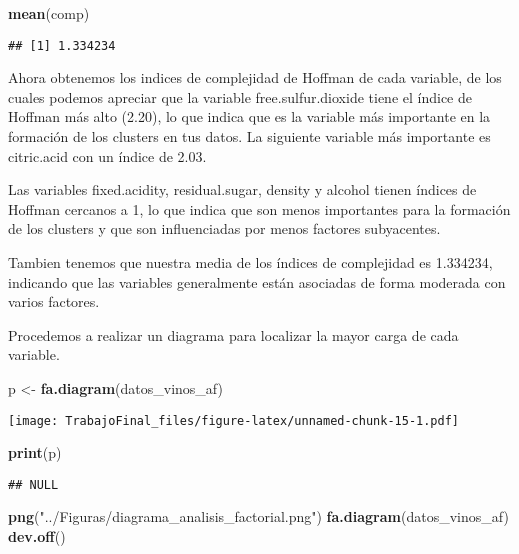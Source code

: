 \documentclass[
]{article}
\newenvironment{Shaded}{\begin{snugshade}}{\end{snugshade}}
\newcommand{\FunctionTok}[1]{\textcolor[rgb]{0.13,0.29,0.53}{\textbf{#1}}}
\newcommand{\NormalTok}[1]{#1}
\newcommand{\OtherTok}[1]{\textcolor[rgb]{0.56,0.35,0.01}{#1}}
\newcommand{\StringTok}[1]{\textcolor[rgb]{0.31,0.60,0.02}{#1}}
\begin{document}
\begin{Shaded}
\begin{Highlighting}[]
\FunctionTok{mean}\NormalTok{(comp)}
\end{Highlighting}
\end{Shaded}

\begin{verbatim}
## [1] 1.334234
\end{verbatim}

Ahora obtenemos los indices de complejidad de Hoffman de cada variable,
de los cuales podemos apreciar que la variable free.sulfur.dioxide tiene
el índice de Hoffman más alto (2.20), lo que indica que es la variable
más importante en la formación de los clusters en tus datos. La
siguiente variable más importante es citric.acid con un índice de 2.03.

Las variables fixed.acidity, residual.sugar, density y alcohol tienen
índices de Hoffman cercanos a 1, lo que indica que son menos importantes
para la formación de los clusters y que son influenciadas por menos
factores subyacentes.

Tambien tenemos que nuestra media de los índices de complejidad es
1.334234, indicando que las variables generalmente están asociadas de
forma moderada con varios factores.

Procedemos a realizar un diagrama para localizar la mayor carga de cada
variable.

\begin{Shaded}
\begin{Highlighting}[]
\NormalTok{p }\OtherTok{\textless{}{-}} \FunctionTok{fa.diagram}\NormalTok{(datos\_vinos\_af)}
\end{Highlighting}
\end{Shaded}

\texttt{[image: TrabajoFinal\_files/figure-latex/unnamed-chunk-15-1.pdf]}

\begin{Shaded}
\begin{Highlighting}[]
\FunctionTok{print}\NormalTok{(p)}
\end{Highlighting}
\end{Shaded}

\begin{verbatim}
## NULL
\end{verbatim}

\begin{Shaded}
\begin{Highlighting}[]
\FunctionTok{png}\NormalTok{(}\StringTok{"../Figuras/diagrama\_analisis\_factorial.png"}\NormalTok{)}
\FunctionTok{fa.diagram}\NormalTok{(datos\_vinos\_af)}
\FunctionTok{dev.off}\NormalTok{()}
\end{Highlighting}
\end{Shaded}
\end{document}
